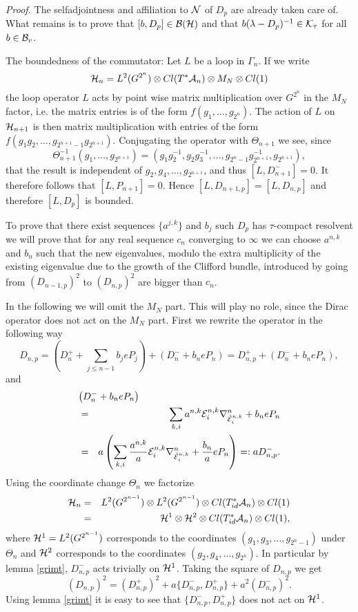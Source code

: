 \documentclass[12pt]{article}
\def\ca{{\cal A}}
\def\cb{{\cal B}}
\def\ce{{\cal E}}
\def\ch{{\cal H}}
\def\ck{{\cal K}}
\def\cn{{\cal N}}
\begin{document}
{\textit{Proof.} The selfadjointness and affiliation to $\cn$ of $D_p$ are already taken care of. What remains is to prove that $[ b, D_p]\in \cb (\ch )$ and that $b (\lambda -D_p)^{-1}\in \ck_\tau$ for all $b\in \cb_v$. 

The boundedness of the commutator: Let $L$ be a loop in $\Gamma_n$. If we write 
$$\ch_n=L^2(G^{2^n})\otimes Cl(T^*\ca_{n})\otimes M_N \otimes Cl(1)$$ the loop operator $L$ acts by point wise matrix multiplication over $G^{2^n}$ in the $M_N$ factor, i.e. the matrix entries is of the form $f(g_1,\ldots , g_{2^n})$. 
The action  of $L$ on $\ch_{n+1}$ is then matrix multiplication with entries of the form $f(g_1g_2,\ldots , g_{2^{n+1}-1}g_{2^{n+1}})$. 
Conjugating the operator with $\Theta_{n+1}$ we see, since 
$$\Theta_{n+1}^{-1}(g_1,\ldots ,g_{2^{n+1}})=(g_1g_2^{-1},g_2g_3^{-1},\ldots, g_{2^n-1}g_{2^{n+1}}^{-1},g_{2^{n+1}}),$$
that the result is independent of $g_2,g_4,\ldots ,g_{2^{n+1}}$, and thus $[L,D_{n+1}^- ]=0$. It therefore follows that $[L,P_{n+1}]=0$. Hence $[L,D_{n+1,p}]=[L,D_{n,p}]$ and therefore $[L,D_p]$ is bounded.

To prove that there exist sequences $\{a^{j,k} \}$ and $b_j$ such $D_p$ has $\tau$-compact resolvent we will prove that for any real sequence $c_n$ converging to $\infty$ we can choose $a^{n,k}$ and $b_n$ such that the new eigenvalues, modulo the extra multiplicity of the existing eigenvalue due to the growth of the Clifford bundle, introduced by going from $(D_{n-1,p})^2$ to $(D_{n,p})^2$ are bigger than $c_n$.   

In the following we will omit  the $M_N$ part. This will play no role, since the Dirac operator does not act on the $M_N$ part. First we rewrite the operator in the following way
$$D_{n,p}=\left( D^+_n+\sum_{j\leq n-1}b_jeP_j  \right) +\left( D^-_n+b_neP_n \right) =D_{n,p}^++\left( D^-_n+b_neP_n \right),$$
and 
\begin{eqnarray*}
\lefteqn{\left( D^-_n+b_neP_n \right)}\\
&=&\sum_{k,i}a^{n,k}\ce_i^{n,k}\nabla^n_{\hat{\ce}_i^{n,k}}+b_n eP_n
\\&=& a\left( \sum_{k,i}\frac{a^{n,k}}{a}\ce_i^{n,k}\nabla^n_{\hat{\ce}_i^{n,k}}+\frac{b_n}{a} eP_n \right)=:aD^-_{n,p}.
\end{eqnarray*}
Using the coordinate change $\Theta_n$ we factorize 
\begin{eqnarray*}\ch_n&=& L^2(G^{2^{n-1}})\otimes L^2(G^{2^{n-1}})\otimes Cl(T^*_{id}\ca_{n})\otimes Cl(1)\\
&=&\ch^1\otimes \ch^2 \otimes Cl(T^*_{id}\ca_{n})\otimes Cl(1),
\end{eqnarray*}
where $\ch^1=L^2(G^{2^{n-1}})$ corresponds to the coordinates $(g_1,g_3,\ldots , g_{2^n-1})$ under $\Theta_n$ and $\ch^2$ corresponds to the coordinates $(g_2,g_4,\ldots , g_{2^n})$. In particular by lemma \ref{grimt}, $D_{n,p}^-$ acts trivially on $\ch^1$. Taking the square of $D_{n,p}$ we get
\begin{equation}
(D_{n,p})^2=(D_{n,p}^+)^2+a\{ D_{n,p}^- ,D_{n,p}^+ \}+a^2 (D_{n,p}^-)^2.
\label{eet}
\end{equation}
Using lemma \ref{grimt} it is easy to see that $ \{ D_{n,p}^- ,D_{n,p}^+ \}$ does not act on $\ch^1$. 

}
\end{document}
